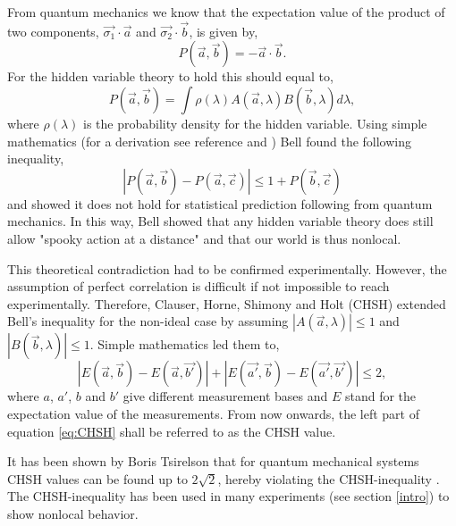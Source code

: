 From quantum mechanics we know that the expectation value of the product of two components,  $\vec{\sigma_1} \cdot \vec{a}$ and  $\vec{\sigma_2} \cdot \vec{b}$, is given by, 
\begin{equation}
P\left(\vec{a},\vec{b}\right) = - \vec{a} \cdot \vec{b}.
\end{equation}
For the hidden variable theory to hold this should equal to, 
\begin{equation}
P\left(\vec{a},\vec{b}\right) = \int \rho ( \lambda) A\left( \vec{a}, \lambda \right) B\left( \vec{b}, \lambda \right) d\lambda,
\end{equation}
where $\rho(\lambda)$ is the probability density for the hidden variable. Using simple mathematics (for a derivation see reference \cite{bell1964on} and \cite{griffiths1995introduction}) Bell found the following inequality, 
\begin{equation}
\left|P\left(\vec{a},\vec{b}\right) - P\left(\vec{a},\vec{c}\right)\right| \leq 1 + P\left(\vec{b},\vec{c}\right)
\end{equation}
and showed it does not hold for statistical prediction following from quantum mechanics. In this way, Bell showed that any hidden variable theory does still allow "spooky action at a distance" and that our world is thus nonlocal. 

This theoretical contradiction had to be  confirmed experimentally. However, the assumption of perfect correlation is difficult if not impossible to reach experimentally. Therefore, Clauser, Horne, Shimony and Holt (CHSH) extended Bell's inequality for the non-ideal case by assuming $\left|A\left( \vec{a}, \lambda \right)\right| \leq 1$ and $\left|B\left( \vec{b}, \lambda \right)\right| \leq 1$. Simple mathematics led them to,
\begin{equation}
\label{eq:CHSH}
\left|E\left(\vec{a},\vec{b}\right) - E\left(\vec{a},\vec{b'}\right)\right| + \left|E\left(\vec{a'},\vec{b}\right) - E\left(\vec{a'},\vec{b'}\right)\right| \leq 2, 
\end{equation}
where $a$, $a'$, $b$ and $b'$ give different measurement bases and $E$ stand for the expectation value of the measurements. From now onwards, the left part of equation \ref{eq:CHSH} shall be referred to as the CHSH value.

It has been shown by Boris Tsirelson that for quantum mechanical systems CHSH values can be found up to $2\sqrt{2}$, hereby violating the CHSH-inequality \cite{cirel1980quantum}. The CHSH-inequality has been used in many experiments (see section \ref{intro}) to show nonlocal behavior. 

